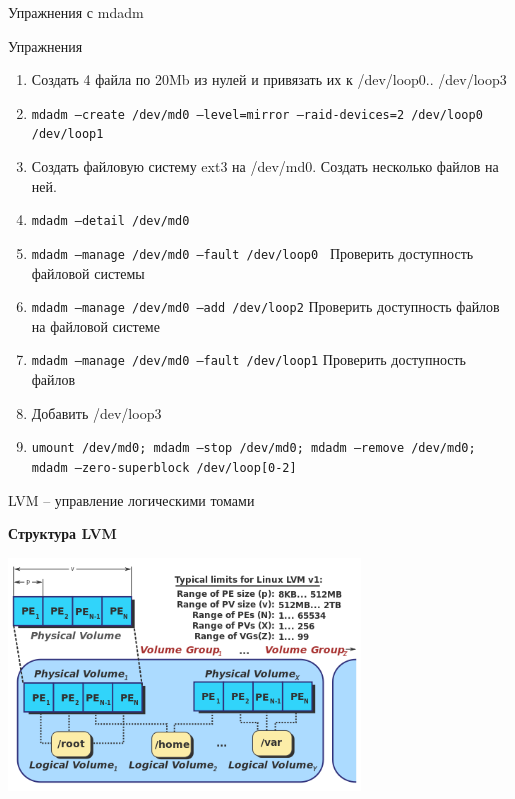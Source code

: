 \documentclass[ignorenonframetext, professionalfonts, hyperref={pdftex, unicode}]{beamer}
\begin{document}
\begin{frame}{Упражнения с mdadm}
  \begin{block}{Упражнения}
    \begin{enumerate}
      \item Создать 4 файла по 20Mb из нулей и привязать их к /dev/loop0.. /dev/loop3
      \item {\tt mdadm --create /dev/md0 --level=mirror --raid-devices=2 /dev/loop0 /dev/loop1}
      \item Создать файловую систему ext3 на /dev/md0. Создать несколько файлов на ней.
      \item {\tt mdadm --detail /dev/md0}
      \item {\tt mdadm --manage /dev/md0 --fault /dev/loop0 } Проверить доступность файловой системы
      \item {\tt mdadm --manage /dev/md0 --add /dev/loop2} Проверить доступность файлов на файловой системе
      \item {\tt mdadm --manage /dev/md0 --fault /dev/loop1} Проверить доступность файлов
      \item Добавить /dev/loop3
      \item {\tt umount /dev/md0; mdadm --stop /dev/md0; mdadm --remove /dev/md0; mdadm --zero-superblock /dev/loop[0-2]}
    \end{enumerate}
  \end{block}
\end{frame}

\begin{frame}{LVM -- управление логическими томами}
  \begin{center}
    \textbf{Структура LVM}
  \end{center}
  \includegraphics[width=0.7\textwidth]{LVM1-wiki.png}
\end{frame}
\end{document}
